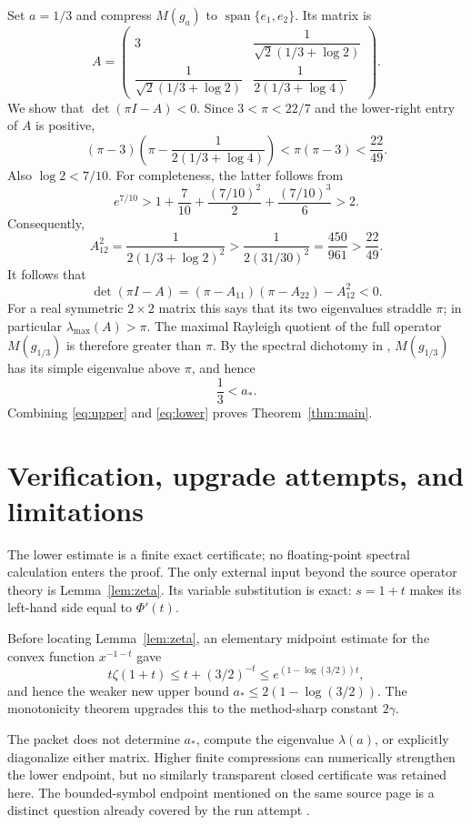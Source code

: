 \documentclass[11pt]{article}
\begin{document}
Set $a=1/3$ and compress $M(g_a)$ to
$\operatorname{span}\{e_1,e_2\}$.  Its matrix is
\[
 A=\begin{pmatrix}
 3 & \dfrac{1}{\sqrt2(1/3+\log2)}\\[6pt]
 \dfrac{1}{\sqrt2(1/3+\log2)}
   & \dfrac{1}{2(1/3+\log4)}
 \end{pmatrix}.
\]
We show that $\det(\pi I-A)<0$.  Since $3<\pi<22/7$ and the lower-right
entry of $A$ is positive,
\[
 (\pi-3)\left(\pi-\frac{1}{2(1/3+\log4)}\right)
 <\pi(\pi-3)<\frac{22}{49}.
\]
Also $\log2<7/10$.  For completeness, the latter follows from
\[
 e^{7/10}>1+\frac7{10}+\frac{(7/10)^2}{2}
                 +\frac{(7/10)^3}{6}>2.
\]
Consequently,
\[
 A_{12}^2
 =\frac{1}{2(1/3+\log2)^2}
 >\frac{1}{2(31/30)^2}
 =\frac{450}{961}
 >\frac{22}{49}.
\]
It follows that
\[
 \det(\pi I-A)
 =(\pi-A_{11})(\pi-A_{22})-A_{12}^2<0.
\]
For a real symmetric $2\times2$ matrix this says that its two eigenvalues
straddle $\pi$; in particular $\lambda_{\max}(A)>\pi$.  The maximal Rayleigh
quotient of the full operator $M(g_{1/3})$ is therefore greater than $\pi$.
By the spectral dichotomy in \cite[Theorem 1.2]{PP}, $M(g_{1/3})$ has its
simple eigenvalue above $\pi$, and hence
\begin{equation}\label{eq:lower}
 \frac13<a_*.
\end{equation}
Combining \eqref{eq:upper} and \eqref{eq:lower} proves
Theorem~\ref{thm:main}.

\section*{Verification, upgrade attempts, and limitations}

The lower estimate is a finite exact certificate; no floating-point spectral
calculation enters the proof.  The only external input beyond the source
operator theory is Lemma~\ref{lem:zeta}.  Its variable substitution is exact:
$s=1+t$ makes its left-hand side equal to $\Phi'(t)$.

Before locating Lemma~\ref{lem:zeta}, an elementary midpoint estimate for the
convex function $x^{-1-t}$ gave
\[
 t\zeta(1+t)\leq t+(3/2)^{-t}
 \leq e^{(1-\log(3/2))t},
\]
and hence the weaker new upper bound
$a_*\leq2(1-\log(3/2))$.  The monotonicity theorem upgrades this to the
method-sharp constant $2\gamma$.

The packet does not determine $a_*$, compute the eigenvalue $\lambda(a)$,
or explicitly diagonalize either matrix.  Higher finite compressions can
numerically strengthen the lower endpoint, but no similarly transparent
closed certificate was retained here.  The bounded-symbol endpoint mentioned
on the same source page is a distinct question already covered by the run
attempt
.
\end{document}
